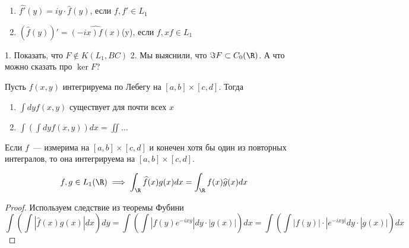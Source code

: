 \begin{theorem}
\begin{enumerate}
    \item $\widehat{f'}(y) = iy \cdot \widehat{f}(y)$, если $f, f' \in L_1$
    \item $(\widehat{f}(y))' = \widehat{(-ix)f(x)}$(y), если $f, xf \in L_1$
\end{enumerate}
\end{theorem}

\begin{exercise}
1. Показать, что $F \not \in K(L_1, BC)$
2. Мы выяснили, что $\Im F \subset C_0(\R)$. А что можно сказать про $\ker F$?
\end{exercise}

\begin{theorem}
Пусть $f(x, y)$ интегрируема по Лебегу на $[a, b] \times [c, d]$. Тогда 
\begin{enumerate}
    \item $\int dy f(x, y)$ существует для почти всех $x$
    \item $\int \left( \int dy f(x, y) \right) dx = 
    \iint \ldots$
\end{enumerate}
\end{theorem}

\begin{corollary}
Если $f$~--- измерима на $[a, b] \times [c, d]$ и конечен хотя бы один из повторных интегралов, то она интегрируема на $[a, b] \times [c, d]$.
\end{corollary}

\begin{theorem}
    \[f, g \in L_1(\R) \implies \int_{\R} \widehat{f}(x) g(x) dx = \int_{\R} f(x) \widehat{g}(x) dx
    \]
\end{theorem}
\begin{proof}
Используем следствие из теоремы Фубини
\[
\int \left( \int |\widehat{f}(x) g(x)| dx \right) dy 
 = \int \left( \int |f(y) e^{-ixy}| dy \cdot |g(x)| \right) dx = \int \left( \int |f(y)| \cdot |e^{-ixy|} dy \cdot |g(x)| \right) dx
\]
\end{proof}